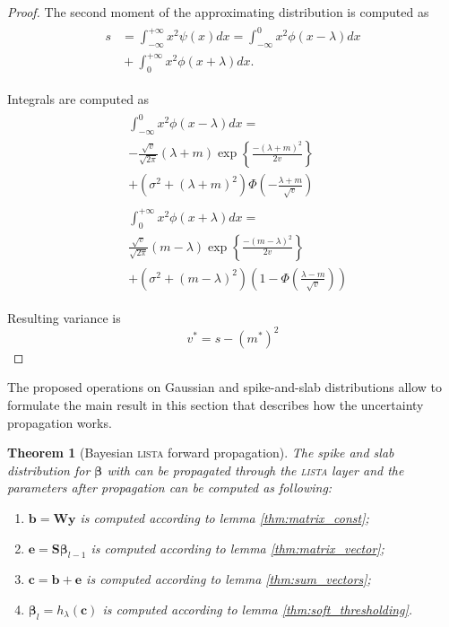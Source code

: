 \documentclass[letterpaper]{article}
\newtheorem{theorem}{Theorem}
\begin{document}
\begin{proof}
The second moment of the approximating distribution is computed as
\begin{align}
\begin{split}
s &= \int_{-\infty}^{+\infty}x^2\psi(x)dx = \int_{-\infty}^{0}x^2\phi(x-\lambda)dx \\
&{}+ \int_{0}^{+\infty}x^2\phi(x+\lambda)dx.
\end{split}
\end{align}

Integrals are computed as
\begin{align}
\begin{split}
&\int_{-\infty}^{0}x^2\phi(x-\lambda)dx = \\
&-\frac{\sqrt{v}}{\sqrt{2\pi}} (\lambda+m)\exp\left\{\frac{-(\lambda+m)^2}{2v}\right\}\\
& + (\sigma^2 + (\lambda+m)^2)\Phi\left(-\frac{\lambda+m}{\sqrt{v}}\right)
\end{split}\\
\begin{split}
&\int_{0}^{+\infty}x^2\phi(x+\lambda)dx = \\
&\frac{\sqrt{v}}{\sqrt{2\pi}} (m - \lambda)\exp\left\{\frac{-(m - \lambda)^2}{2v}\right\}\\
& + (\sigma^2 + (m - \lambda)^2)\left(1 - \Phi\left(\frac{\lambda -m}{\sqrt{v}}\right)\right)
\end{split}
\end{align}

Resulting variance is
\begin{equation}
v^* = s- (m^*)^2
\end{equation}

\end{proof}

The proposed operations on Gaussian and spike-and-slab distributions allow to formulate the main result in this section that describes how the uncertainty propagation works.
\begin{theorem}[Bayesian \textsc{lista} forward propagation]
\label{thm:prob_layer}
The spike and slab distribution for $\boldsymbol\beta$ with can be propagated through the \textsc{lista} layer and the parameters after propagation can be computed as following:
\begin{enumerate}
	\item $\mathbf{b} = \mathbf{W}\mathbf{y}$ is computed according to lemma \ref{thm:matrix_const};
	\item $\mathbf{e} = \mathbf{S}\boldsymbol\beta_{l-1}$ is computed according to lemma \ref{thm:matrix_vector};
	\item $\mathbf{c} = \mathbf{b} + \mathbf{e}$ is computed according to lemma \ref{thm:sum_vectors};
	\item $\boldsymbol\beta_{l} = h_\lambda(\mathbf{c})$ is computed according to lemma \ref{thm:soft_thresholding}.
\end{enumerate}
\end{theorem}
\end{document}
